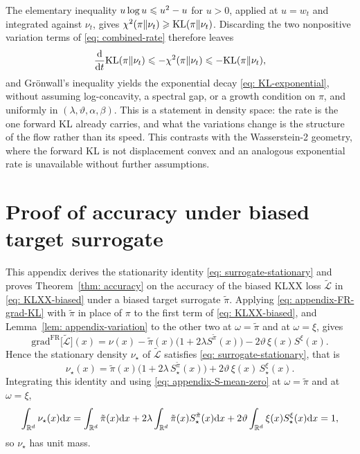 \documentclass{article}
\begin{document}
The elementary inequality $u\log u\leqslant u^2-u$ for $u>0$, applied at $u=w_t$ and integrated against $\nu_t$, gives $\chi^2(\pi\|\nu_t)\geqslant\mathrm{KL}(\pi\|\nu_t)$. Discarding the two nonpositive variation terms of \eqref{eq: combined-rate} therefore leaves
\begin{equation*}
    \frac{\mathrm{d}}{\mathrm{d} t}\mathrm{KL}(\pi\|\nu_t) \leqslant -\chi^2(\pi\|\nu_t) \leqslant -\mathrm{KL}(\pi\|\nu_t) ,
\end{equation*}
and Gr\"onwall's inequality yields the exponential decay \eqref{eq: KL-exponential}, without assuming log-concavity, a spectral gap, or a growth condition on $\pi$, and uniformly in $(\lambda,\vartheta,\alpha,\beta)$. This is a statement in density space: the rate is the one forward KL already carries, and what the variations change is the structure of the flow rather than its speed. This contrasts with the Wasserstein-2 geometry, where the forward KL is not displacement convex and an analogous exponential rate is unavailable without further assumptions.

\section{Proof of accuracy under biased target surrogate}
\label{sec: appendix-accuracy}

This appendix derives the stationarity identity \eqref{eq: surrogate-stationary} and proves Theorem~\ref{thm: accuracy} on the accuracy of the biased KLXX loss $\tilde{\mathcal L}$ in \eqref{eq: KLXX-biased} under a biased target surrogate $\tilde\pi$. Applying \eqref{eq: appendix-FR-grad-KL} with $\tilde\pi$ in place of $\pi$ to the first term of \eqref{eq: KLXX-biased}, and Lemma~\ref{lem: appendix-variation} to the other two at $\omega=\tilde\pi$ and at $\omega=\xi$, gives
\begin{equation*}
    \mathrm{grad}^{\mathrm{FR}}\bigl[\tilde{\mathcal L}\bigr](x) = \nu(x) - \tilde\pi(x)\bigl(1+2\lambda S^{\tilde\pi}(x)\bigr) - 2\vartheta\,\xi(x)S^{\xi}(x) .
\end{equation*}
Hence the stationary density $\nu_\star$ of $\tilde{\mathcal L}$ satisfies \eqref{eq: surrogate-stationary}, that is
\begin{equation*}
	\nu_\star(x) = \tilde\pi(x)\bigl(1 + 2\lambda\,S^{\tilde\pi}_\star(x)\bigr) + 2\vartheta\,\xi(x)\,S^{\xi}_\star(x) .
\end{equation*}
Integrating this identity and using \eqref{eq: appendix-S-mean-zero} at $\omega=\tilde\pi$ and at $\omega=\xi$,
\begin{equation*}
	\int_{\mathbb R^d} \nu_\star(x)\mathrm{d} x = \int_{\mathbb R^d} \tilde\pi(x)\mathrm{d} x
	+2\lambda\int_{\mathbb R^d} \tilde\pi(x)S^{\tilde\pi}_\star(x)\mathrm{d} x +
	2\vartheta\int_{\mathbb R^d}\xi(x)S^{\xi}_\star(x)\mathrm{d} x = 1 ,
\end{equation*}
so $\nu_\star$ has unit mass.
\end{document}
